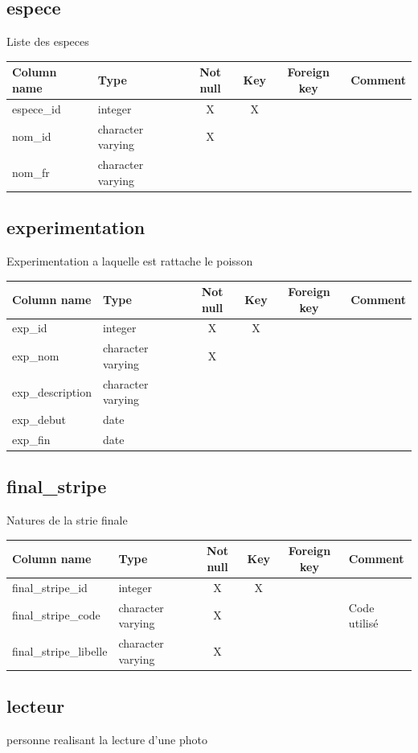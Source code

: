 \subsection{espece}
Liste des especes

\begin{tabular}{|l| p{2cm}|c|c|c| p{3cm}|}
\hline
Column name & Type & Not null & Key & Foreign key & Comment \\
\hline
espece\_id & integer & X & X & & \\
\hline
nom\_id & character varying & X & & & \\
\hline
nom\_fr & character varying & & & & \\
\hline
\end{tabular}
\subsection{experimentation}
Experimentation a laquelle est rattache le poisson

\begin{tabular}{|l| p{2cm}|c|c|c| p{3cm}|}
\hline
Column name & Type & Not null & Key & Foreign key & Comment \\
\hline
exp\_id & integer & X & X & & \\
\hline
exp\_nom & character varying & X & & & \\
\hline
exp\_description & character varying & & & & \\
\hline
exp\_debut & date & & & & \\
\hline
exp\_fin & date & & & & \\
\hline
\end{tabular}
\subsection{final\_stripe}
Natures de la strie finale

\begin{tabular}{|l| p{2cm}|c|c|c| p{3cm}|}
\hline
Column name & Type & Not null & Key & Foreign key & Comment \\
\hline
final\_stripe\_id & integer & X & X & & \\
\hline
final\_stripe\_code & character varying & X & & & Code utilisé\\
\hline
final\_stripe\_libelle & character varying & X & & & \\
\hline
\end{tabular}
\subsection{lecteur}
personne realisant la lecture d'une photo

